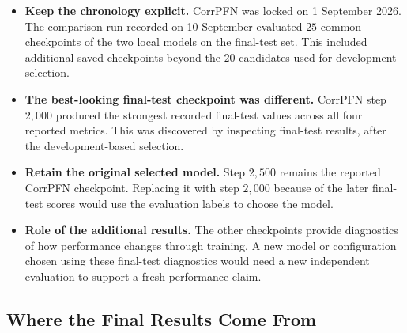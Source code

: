 \documentclass[11pt]{article}
\newenvironment{notes}
  {\begin{itemize}\setlength{\itemsep}{0.45em}\setlength{\parsep}{0pt}}
  {\end{itemize}}
\begin{document}
\begin{notes}
    \item \textbf{Keep the chronology explicit.}
    CorrPFN was locked on 1 September 2026.
    The comparison run recorded on 10 September evaluated
    \(25\) common checkpoints of the two local models on
    the final-test set. This included additional saved
    checkpoints beyond the \(20\) candidates used for
    development selection.

    \item \textbf{The best-looking final-test checkpoint was different.}
    CorrPFN step \(2{,}000\) produced the strongest recorded
    final-test values across all four reported metrics.
    This was discovered by inspecting final-test results,
    after the development-based selection.

    \item \textbf{Retain the original selected model.}
    Step \(2{,}500\) remains the reported CorrPFN checkpoint.
    Replacing it with step \(2{,}000\) because of the later
    final-test scores would use the evaluation labels to
    choose the model.

    \item \textbf{Role of the additional results.}
    The other checkpoints provide diagnostics of how
    performance changes through training.
    A new model or configuration chosen using these
    final-test diagnostics would need a new independent
    evaluation to support a fresh performance claim.
\end{notes}

\subsection{Where the Final Results Come From}
\label{sec:final-result-provenance}
\end{document}
